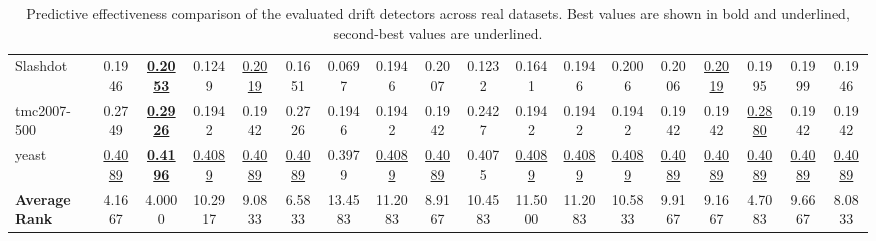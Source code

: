 \begin{table}[t]
{\begin{tabular}{lccccccccccccccccc}
Slashdot & 0.1946 & \textbf{\underline{0.2053}} & 0.1249 & \underline{0.2019} & 0.1651 & 0.0697 & 0.1946 & 0.2007 & 0.1232 & 0.1641 & 0.1946 & 0.2006 & 0.2006 & \underline{0.2019} & 0.1995 & 0.1999 & 0.1946 \\
tmc2007-500 & 0.2749 & \textbf{\underline{0.2926}} & 0.1942 & 0.1942 & 0.2726 & 0.1946 & 0.1942 & 0.1942 & 0.2427 & 0.1942 & 0.1942 & 0.1942 & 0.1942 & 0.1942 & \underline{0.2880} & 0.1942 & 0.1942 \\
yeast & \underline{0.4089} & \textbf{\underline{0.4196}} & \underline{0.4089} & \underline{0.4089} & \underline{0.4089} & 0.3979 & \underline{0.4089} & \underline{0.4089} & 0.4075 & \underline{0.4089} & \underline{0.4089} & \underline{0.4089} & \underline{0.4089} & \underline{0.4089} & \underline{0.4089} & \underline{0.4089} & \underline{0.4089} \\
\midrule
\textbf{Average Rank} & 4.1667 & 4.0000 & 10.2917 & 9.0833 & 6.5833 & 13.4583 & 11.2083 & 8.9167 & 10.4583 & 11.5000 & 11.2083 & 10.5833 & 9.9167 & 9.1667 & 4.7083 & 9.6667 & 8.0833 \\
\bottomrule
\end{tabular}
}
\caption{Predictive effectiveness comparison of the evaluated drift detectors across real datasets. Best values are shown in bold and underlined, second-best values are underlined.}
\label{tab:method_comparison}
\end{table}